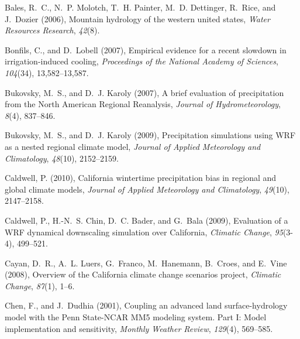 \documentclass[draft,ms]{agutex}   %
\begin{document}
\begin{article}
\begin{thebibliography}{72}
Bales, R.~C., N.~P. Molotch, T.~H. Painter, M.~D. Dettinger, R.~Rice, and
  J.~Dozier (2006), Mountain hydrology of the western united states,
  \textit{Water Resources Research}, \textit{42}(8).

Bonfils, C., and D.~Lobell (2007), Empirical evidence for a recent slowdown in
  irrigation-induced cooling, \textit{Proceedings of the National Academy of
  Sciences}, \textit{104}(34), 13,582--13,587.

Bukovsky, M.~S., and D.~J. Karoly (2007), {A brief evaluation of precipitation
  from the North American Regional Reanalysis}, \textit{Journal of
  Hydrometeorology}, \textit{8}(4), 837--846.

Bukovsky, M.~S., and D.~J. Karoly (2009), {Precipitation simulations using WRF
  as a nested regional climate model}, \textit{Journal of Applied Meteorology
  and Climatology}, \textit{48}(10), 2152--2159.

Caldwell, P. (2010), California wintertime precipitation bias in regional and
  global climate models, \textit{Journal of Applied Meteorology and
  Climatology}, \textit{49}(10), 2147--2158.

Caldwell, P., H.-N.~S. Chin, D.~C. Bader, and G.~Bala (2009), {Evaluation of a
  WRF dynamical downscaling simulation over California}, \textit{Climatic
  Change}, \textit{95}(3-4), 499--521.

Cayan, D.~R., A.~L. Luers, G.~Franco, M.~Hanemann, B.~Croes, and E.~Vine
  (2008), {Overview of the California climate change scenarios project},
  \textit{Climatic Change}, \textit{87}(1), 1--6.

Chen, F., and J.~Dudhia (2001), {Coupling an advanced land surface-hydrology
  model with the Penn State-NCAR MM5 modeling system. Part I: Model
  implementation and sensitivity}, \textit{Monthly Weather Review},
  \textit{129}(4), 569--585.


\end{thebibliography}
\end{article}
\end{document}
